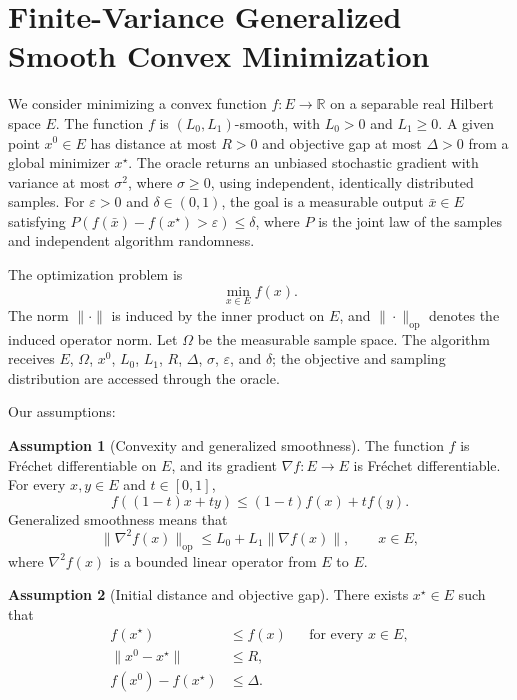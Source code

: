 \documentclass[10pt]{article}
\theoremstyle{definition}
\newtheorem{assumption}{Assumption}
\begin{document}
\section*{Finite-Variance Generalized Smooth Convex Minimization}
We consider minimizing a convex function $f:E\to\mathbb{R}$ on a separable real Hilbert space $E$. The function $f$ is $(L_0,L_1)$-smooth, with $L_0>0$ and $L_1\geq0$. A given point $x^0\in E$ has distance at most $R>0$ and objective gap at most $\Delta>0$ from a global minimizer $x^\star$. The oracle returns an unbiased stochastic gradient with variance at most $\sigma^2$, where $\sigma\geq0$, using independent, identically distributed samples. For $\varepsilon>0$ and $\delta\in(0,1)$, the goal is a measurable output $\bar{x}\in E$ satisfying $P(f(\bar{x})-f(x^\star)>\varepsilon)\leq\delta$, where $P$ is the joint law of the samples and independent algorithm randomness.

The optimization problem is
\[
\min_{x\in E} f(x).
\]
The norm $\|\cdot\|$ is induced by the inner product on $E$, and $\|\cdot\|_{\mathrm{op}}$ denotes the induced operator norm. Let $\Omega$ be the measurable sample space. The algorithm receives $E$, $\Omega$, $x^0$, $L_0$, $L_1$, $R$, $\Delta$, $\sigma$, $\varepsilon$, and $\delta$; the objective and sampling distribution are accessed through the oracle.

Our assumptions:
\begin{assumption}[Convexity and generalized smoothness]
The function $f$ is Fr\'echet differentiable on $E$, and its gradient $\nabla f:E\to E$ is Fr\'echet differentiable. For every $x,y\in E$ and $t\in[0,1]$,
\[
f((1-t)x+ty)\leq (1-t)f(x)+t f(y).
\]
Generalized smoothness means that
\[
\|\nabla^2 f(x)\|_{\mathrm{op}}
\leq L_0+L_1\|\nabla f(x)\|,
\qquad x\in E,
\]
where $\nabla^2 f(x)$ is a bounded linear operator from $E$ to $E$.
\end{assumption}

\begin{assumption}[Initial distance and objective gap]
There exists $x^\star\in E$ such that
\[
\begin{aligned}
f(x^\star)&\leq f(x) &&\text{for every }x\in E,\\
\|x^0-x^\star\|&\leq R,\\
f(x^0)-f(x^\star)&\leq\Delta.
\end{aligned}
\]
\end{assumption}
\end{document}
